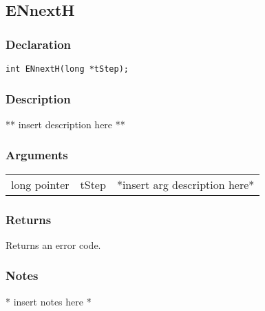 \subsection{ENnextH}
\subsubsection{Declaration}
\begin{lstlisting}
int ENnextH(long *tStep);
\end{lstlisting}
\subsubsection{Description}
** insert description here **
\subsubsection{Arguments}
\begin{tabular}{l r p{11cm} }
long pointer&tStep&*insert arg description here* \\[6pt]
\end{tabular}
\subsubsection{Returns}
Returns an error code.
\subsubsection{Notes}
* insert notes here *